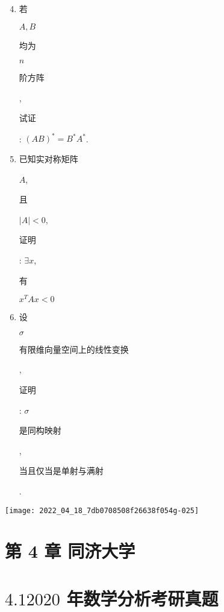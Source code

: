 \documentclass[10pt]{article}
\begin{document}
\begin{enumerate}
  \setcounter{enumi}{3}
  \item \begin{CJK}{UTF8}{mj}若\end{CJK} $A, B$ \begin{CJK}{UTF8}{mj}均为\end{CJK} $n$ \begin{CJK}{UTF8}{mj}阶方阵\end{CJK}, \begin{CJK}{UTF8}{mj}试证\end{CJK}: $(A B)^{*}=B^{*} A^{*}$.

  \item \begin{CJK}{UTF8}{mj}已知实对称矩阵\end{CJK} $A$, \begin{CJK}{UTF8}{mj}且\end{CJK} $|A|<0$, \begin{CJK}{UTF8}{mj}证明\end{CJK}: $\exists x$, \begin{CJK}{UTF8}{mj}有\end{CJK} $x^{T} A x<0$

  \item \begin{CJK}{UTF8}{mj}设\end{CJK} $\sigma$ \begin{CJK}{UTF8}{mj}有限维向量空间上的线性变换\end{CJK}, \begin{CJK}{UTF8}{mj}证明\end{CJK}: $\sigma$ \begin{CJK}{UTF8}{mj}是同构映射\end{CJK},\begin{CJK}{UTF8}{mj}当且仅当是单射与满射\end{CJK}.

\end{enumerate}
\texttt{[image: 2022\_04\_18\_7db0708508f26638f054g-025]}

\section{第 4 章 同济大学}
\section{$4.12020$ 年数学分析考研真题}
\end{document}
